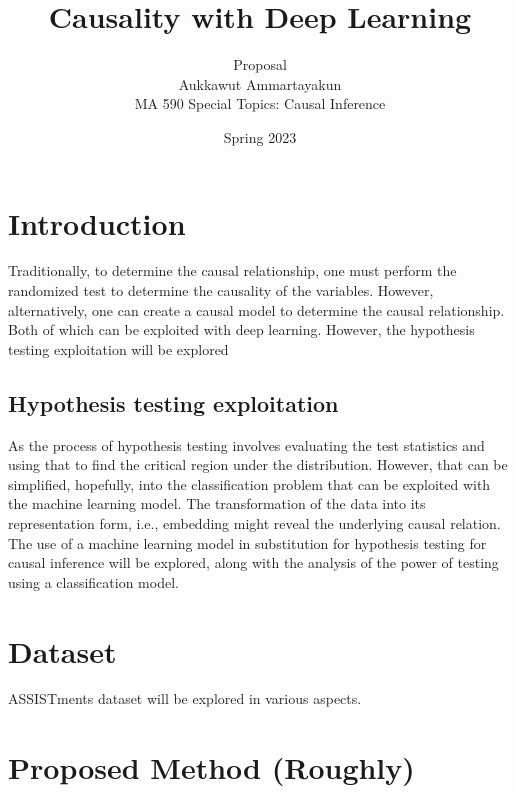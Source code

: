 \documentclass{article}
\title{Causality with Deep Learning}
\author{Proposal\\Aukkawut Ammartayakun\\MA 590 Special Topics: Causal Inference}
\date{Spring 2023}
\begin{document}
\maketitle
%
%
%            
%
%


\section{Introduction}
Traditionally, to determine the causal relationship, one must perform the randomized test to determine the causality of the variables. However, alternatively, one can create a causal model to determine the causal relationship. Both of which can be exploited with deep learning. However, the hypothesis testing exploitation will be explored
\subsection{Hypothesis testing exploitation}
As the process of hypothesis testing involves evaluating the test statistics and using that to find the critical region under the distribution. However, that can be simplified, hopefully, into the classification problem that can be exploited with the machine learning model. The transformation of the data into its representation form, i.e., embedding might reveal the underlying causal relation. The use of a machine learning model in substitution for hypothesis testing for causal inference will be explored, along with the analysis of the power of testing using a classification model.
\section{Dataset}
ASSISTments dataset\cite{assistment} will be explored in various aspects.
\section{Proposed Method (Roughly)}
\end{document}
